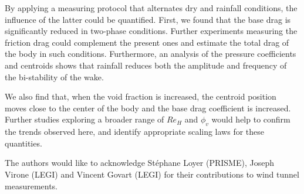 \documentclass[doublecol]{epl2}
\begin{document}
By applying a measuring protocol that alternates dry and rainfall conditions, the influence of the latter could be quantified. First, we found that the base drag is significantly reduced in two-phase conditions. Further experiments measuring the friction drag could complement the present ones and estimate the total drag of the body in such conditions. Furthermore, an analysis of the pressure coefficients and centroids shows that rainfall reduces both the amplitude and frequency of the bi-stability of the wake. 

We also find that, when the void fraction is increased, the centroid position moves close to the center of the body and the base drag coefficient is increased. Further studies exploring a broader range of $Re_H$ and $\phi_v$ would help to confirm the trends observed here, and identify appropriate scaling laws for these quantities.

\acknowledgments
The authors would like to acknowledge St{\'e}phane Loyer (PRISME), Joseph Virone (LEGI) and Vincent Govart (LEGI) for their contributions to wind tunnel measurements.


\end{document}
